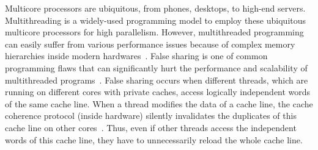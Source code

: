Multicore processors are ubiquitous, from phones, desktops, to high-end servers. Multithreading is a widely-used programming model to employ these ubiquitous multicore processors for high parallelism. However, multithreaded programming can easily suffer from various performance issues because of complex memory hierarchies inside modern hardwares~\cite{ibs-sc,ibs-sc2,Dramon}. False sharing is one of common programming flaws that can significantly hurt the performance and scalability of multithreaded programs~\cite{falseshare:effect}. False sharing occurs when different threads, which are running on different cores with private caches, access logically independent words of the same cache line. When a thread modifies the data of a cache line, the cache coherence protocol (inside hardware) silently invalidates the duplicates of this cache line on other cores~\cite{MESI}. Thus, even if other threads access the independent words of this cache line, they have to unnecessarily reload the whole cache line. 

